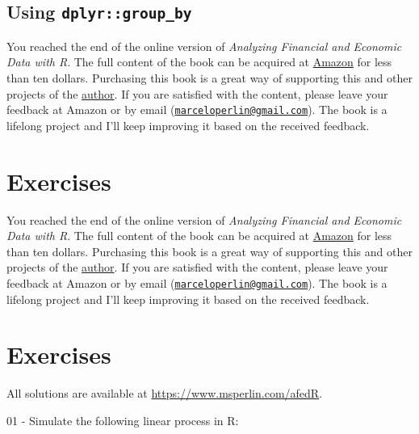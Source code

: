 \documentclass[
  12pt,
]{book}
\newenvironment{pleasebuyit}
{\begin{noteblock}
		
	} {\end{noteblock}}
\begin{document}
\hypertarget{using-dplyrgroup_by}{%
\subsection{\texorpdfstring{Using \texttt{dplyr::group\_by}}{Using dplyr::group\_by}}\label{using-dplyrgroup_by}}

\begin{pleasebuyit}
You reached the end of the online version of \emph{Analyzing Financial
and Economic Data with R}. The full content of the book can be acquired
at \href{https://www.amazon.com/dp/B084LSNXMN}{Amazon} for less than ten
dollars. Purchasing this book is a great way of supporting this and
other projects of the \href{https://www.msperlin.com/blog/}{author}. If
you are satisfied with the content, please leave your feedback at Amazon
or by email
(\href{mailto:marceloperlin@gmail.com}{\nolinkurl{marceloperlin@gmail.com}}).
The book is a lifelong project and I'll keep improving it based on the
received feedback.
\end{pleasebuyit}

\hypertarget{exercises-11}{%
\section{Exercises}\label{exercises-11}}

\begin{pleasebuyit}
You reached the end of the online version of \emph{Analyzing Financial
and Economic Data with R}. The full content of the book can be acquired
at \href{https://www.amazon.com/dp/B084LSNXMN}{Amazon} for less than ten
dollars. Purchasing this book is a great way of supporting this and
other projects of the \href{https://www.msperlin.com/blog/}{author}. If
you are satisfied with the content, please leave your feedback at Amazon
or by email
(\href{mailto:marceloperlin@gmail.com}{\nolinkurl{marceloperlin@gmail.com}}).
The book is a lifelong project and I'll keep improving it based on the
received feedback.
\end{pleasebuyit}

\hypertarget{exercises-12}{%
\section{Exercises}\label{exercises-12}}

All solutions are available at \url{https://www.msperlin.com/afedR}.

01 -
Simulate the following linear process in R:
\end{document}

